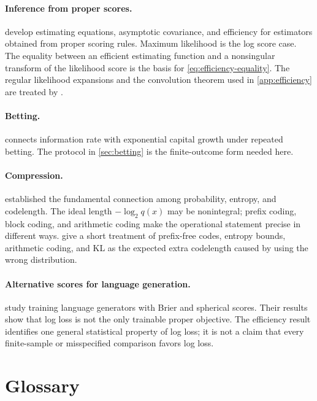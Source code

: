 \documentclass[11pt,twoside]{article}
\theoremstyle{definition}
\theoremstyle{remark}
\begin{document}
\paragraph{Inference from proper scores.}
\citet{dawid2016} develop estimating equations, asymptotic covariance, and efficiency for
estimators obtained from proper scoring rules. Maximum likelihood is the log
score case. The equality between an efficient estimating function and a
nonsingular transform of the likelihood score is the basis for
\cref{eq:efficiency-equality}. The regular likelihood expansions and the
convolution theorem used in \cref{app:efficiency} are treated by
\citet[Chapters~7--8]{vandervaart1998}.

\paragraph{Betting.}
\citet{kelly1956} connects information rate with exponential capital growth
under repeated betting. The protocol in \cref{sec:betting} is the
finite-outcome form needed here.

\paragraph{Compression.}
\citet{shannon1948} established the fundamental connection among probability,
entropy, and codelength. The ideal length $-\log_2q(x)$ may be nonintegral;
prefix coding, block coding, and arithmetic coding make the operational
statement precise in different ways. \citet[Chapter~14]{lattimore2020} give a
short treatment of prefix-free codes, entropy bounds, arithmetic coding, and
KL as the expected extra codelength caused by using the wrong distribution.

\paragraph{Alternative scores for language generation.}
\citet{shao2024} study training language generators with Brier and spherical
scores. Their results show that log loss is not the only trainable proper
objective. The efficiency result identifies one general statistical property
of log loss; it is not a claim that every finite-sample or misspecified
comparison favors log loss.



\clearpage

\section*{Glossary}
\label{sec:glossary}
\end{document}
